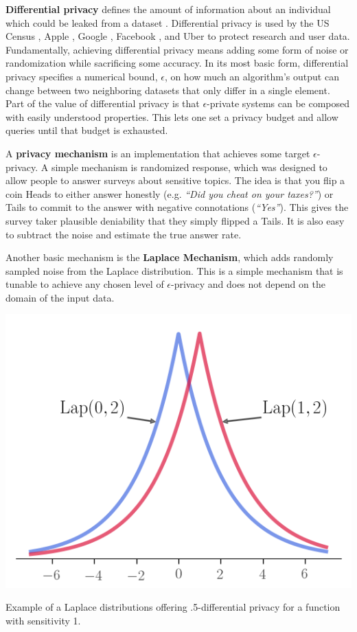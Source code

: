 \documentclass[nobib]{tufte-handout}
\begin{document}
\textbf{Differential privacy} defines the amount of information about an
individual which could be leaked from a dataset \cite{dwork2014algorithmic}.
Differential privacy is used by the US Census \cite{census-differential-privacy},
Apple \cite{apple-differential-privacy}, Google \cite{google-differential-privacy},
Facebook \cite{facebook-url-release}, and Uber \cite{uber-differential-privacy}
to protect research and user data. Fundamentally, achieving differential privacy
means adding some form of noise or randomization while sacrificing some
accuracy. In its most basic form, differential privacy specifies a numerical bound,
$\epsilon$, on how much an algorithm’s output can change between two neighboring
datasets that only differ in a single element. Part of the value of differential
privacy is that $\epsilon$-private systems can be composed with easily
understood properties. This lets one set a privacy budget and allow queries
until that budget is exhausted.

A \textbf{privacy mechanism} is an implementation that achieves some target
$\epsilon$-privacy. A simple mechanism is randomized response, which was
designed to allow people to answer surveys about sensitive topics. The idea is
that you flip a coin Heads to either answer honestly (e.g. \textit{“Did you
cheat on your taxes?”}) or Tails to commit to the answer with negative
connotations (\textit{“Yes”}). This gives the survey taker plausible deniability
that they simply flipped a Tails. It is also easy to subtract the noise and
estimate the true answer rate.

Another basic mechanism is the \textbf{Laplace Mechanism}, which adds randomly
sampled noise from the Laplace distribution. This is a simple mechanism that is
tunable to achieve any chosen level of $\epsilon$-privacy and does not depend on
the domain of the input data.

\begin{marginfigure} \includegraphics[width=\linewidth]{laplace}
\caption{Example of a Laplace distributions offering .5-differential privacy for
a function with sensitivity 1.} \label{fig:laplace} \end{marginfigure}
\end{document}
